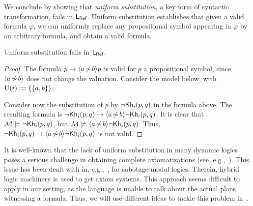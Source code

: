 We conclude by showing that \emph{uniform substitution}, a key form of syntactic transformation, fails in $\mathsf{L_{Ref}}$. Uniform substitution establishes that given a valid formula $\varphi$, we can uniformly replace any propositional symbol appearing in $\varphi$ by an arbitrary formula, and obtain a valid formula.

\medskip

\begin{proposition}\label{prop:substitution-ref}
    Uniform substitution fails in $\mathsf{L_{Ref}}$.
\end{proposition}

\begin{proof}
The formula $p\to\langle a{\,\not\sim\,}b \rangle p$ is valid for $p$ a propositional symbol, since $\langle a{\,\not\sim\,}b \rangle$ does not change the valuation. Consider the model below, with $\operatorname{U}(i):=\{ \{ a,b \} \}$:
\begin{center}
\end{center}
Consider now the substitution of $p$ by $\neg{\sf Kh}_i(p,q)$ in the formula above. The resulting formula is $\neg{\sf Kh}_i(p,q)\to\langle a{\,\not\sim\,}b \rangle\neg{\sf Kh}_i(p,q)$. It is clear that $\mathcal{M}\models\neg{\sf Kh}_i(p,q)$, but $\mathcal{M}\not\models\langle a{\,\not\sim\,}b \rangle\neg{\sf Kh}_i(p,q)$. Thus, $\neg{\sf Kh}_i(p,q)\to\langle a{\,\not\sim\,}b \rangle\neg{\sf Kh}_i(p,q)$ is not valid.
\end{proof}

It is well-known that the lack of uniform substitution in many dynamic logics poses a serious challenge in obtaining complete axiomatizations (see, e.g.,~\cite{HoHoIc11}). This issue has been dealt with in, e.g.,~\cite{BenthemMZ2022,BenthemLSY22}, for sabotage modal logics.
Therein, hybrid logic machinery is used to get axiom systems. This approach seems difficult to apply in our setting, as the language is unable to talk about the actual plans witnessing a formula. Thus, we will use different ideas to tackle this problem in~.

%

